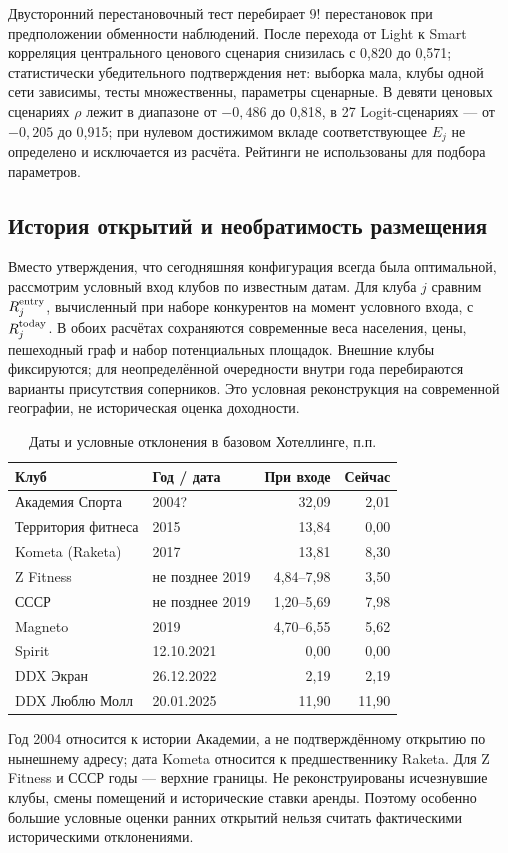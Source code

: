 \documentclass[12pt,a4paper]{article}
\begin{document}
Двусторонний перестановочный тест перебирает $9!$ перестановок при предположении обменности наблюдений. После перехода от Light к Smart корреляция центрального ценового сценария снизилась с 0,820 до 0,571; статистически убедительного подтверждения нет: выборка мала, клубы одной сети зависимы, тесты множественны, параметры сценарные. В девяти ценовых сценариях $\rho$ лежит в диапазоне от $-0,486$ до 0,818, в 27 Logit-сценариях --- от $-0,205$ до 0,915; при нулевом достижимом вкладе соответствующее $E_j$ не определено и исключается из расчёта. Рейтинги не использованы для подбора параметров.

\subsection{История открытий и необратимость размещения}
Вместо утверждения, что сегодняшняя конфигурация всегда была оптимальной, рассмотрим условный вход клубов по известным датам. Для клуба $j$ сравним $R_j^{\rm entry}$, вычисленный при наборе конкурентов на момент условного входа, с $R_j^{\rm today}$. В обоих расчётах сохраняются современные веса населения, цены, пешеходный граф и набор потенциальных площадок. Внешние клубы фиксируются; для неопределённой очередности внутри года перебираются варианты присутствия соперников. Это условная реконструкция на современной географии, не историческая оценка доходности.
\begin{table}[H]\centering\caption{Даты и условные отклонения в базовом Хотеллинге, п.п.}\small\begin{tabularx}{\linewidth}{YYrr}\toprule Клуб & Год / дата & При входе & Сейчас\\\midrule Академия Спорта & 2004? & 32,09 & 2,01\\ Территория фитнеса & 2015 & 13,84 & 0,00\\ Kometa (Raketa) & 2017 & 13,81 & 8,30\\ Z Fitness & не позднее 2019 & 4,84--7,98 & 3,50\\ СССР & не позднее 2019 & 1,20--5,69 & 7,98\\ Magneto & 2019 & 4,70--6,55 & 5,62\\ Spirit & 12.10.2021 & 0,00 & 0,00\\ DDX Экран & 26.12.2022 & 2,19 & 2,19\\ DDX Люблю Молл & 20.01.2025 & 11,90 & 11,90\\\bottomrule\end{tabularx}\end{table}
Год 2004 относится к истории Академии, а не подтверждённому открытию по нынешнему адресу; дата Kometa относится к предшественнику Raketa. Для Z Fitness и СССР годы --- верхние границы. Не реконструированы исчезнувшие клубы, смены помещений и исторические ставки аренды. Поэтому особенно большие условные оценки ранних открытий нельзя считать фактическими историческими отклонениями.
\end{document}
